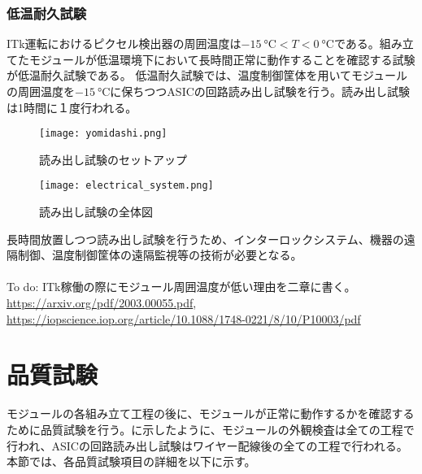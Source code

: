 \subsubsection*{低温耐久試験}

ITk運転におけるピクセル検出器の周囲温度は$-15\ \si{\degreeCelsius}<T<0\ \si{\degreeCelsius}$である。組み立てたモジュールが低温環境下において長時間正常に動作することを確認する試験が低温耐久試験である。
低温耐久試験では、温度制御筐体を用いてモジュールの周囲温度を$-15\ \si{\degreeCelsius}$に保ちつつASICの回路読み出し試験を行う。読み出し試験は1時間に１度行われる。
\begin{figure}[tbp]
  \centering
  \texttt{[image: yomidashi.png]}
  \caption[読み出し試験のセットアップ]{読み出し試験のセットアップ \cite{studyofID} }
  \label{fig:yomidashi}
\end{figure}
\begin{figure}[tbp]
  \centering
  \texttt{[image: electrical\_system.png]}
  \caption[読み出し試験の全体図]{読み出し試験の全体図 \cite{studyofID} }
  \label{fig:electrical-system}
\end{figure}

長時間放置しつつ読み出し試験を行うため、インターロックシステム、機器の遠隔制御、温度制御筐体の遠隔監視等の技術が必要となる。
\\
\\
To do: ITk稼働の際にモジュール周囲温度が低い理由を二章に書く。\\
\url{https://arxiv.org/pdf/2003.00055.pdf}, \\
\url{https://iopscience.iop.org/article/10.1088/1748-0221/8/10/P10003/pdf}
\\




\section{品質試験}
\label{sec:QCtest}

モジュールの各組み立て工程の後に、モジュールが正常に動作するかを確認するために品質試験を行う。に示したように、モジュールの外観検査は全ての工程で行われ、ASICの回路読み出し試験はワイヤー配線後の全ての工程で行われる。本節では、各品質試験項目の詳細を以下に示す。




